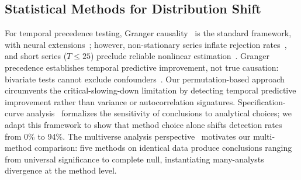 \subsection{Statistical Methods for Distribution Shift}
\label{sec:rw_methods}

For temporal precedence testing, Granger causality~\citep{granger1969investigating} is the standard framework, with neural extensions~\citep{tank2021neural,runge2019detecting}; however, non-stationary series inflate rejection rates~\citep{granger1974spurious}, and short series ($T{\leq}25$) preclude reliable nonlinear estimation~\citep{boettiger2012limits}.
Granger precedence establishes temporal predictive improvement, not true causation: bivariate tests cannot exclude confounders~\citep{shojaie2022granger}.
Our permutation-based approach circumvents the critical-slowing-down limitation by detecting temporal predictive improvement rather than variance or autocorrelation signatures.
Specification-curve analysis~\citep{simonsohn2020specification} formalizes the sensitivity of conclusions to analytical choices; we adapt this framework to show that method choice alone shifts detection rates from 0\% to 94\%.
The multiverse analysis perspective~\citep{steegen2016increasing,silberzahn2018many,coretta2023multidimensional,kapoor2024reforms} motivates our multi-method comparison: five methods on identical data produce conclusions ranging from universal significance to complete null, instantiating many-analysts divergence at the method level.
